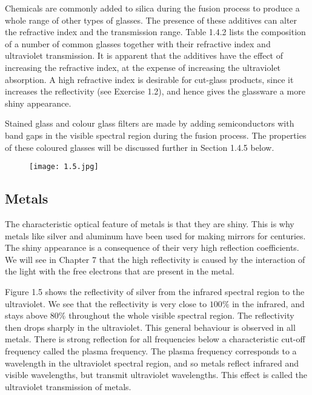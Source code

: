 \documentclass[12pt]{book}
\begin{document}
Chemicals are commonly added to silica during the fusion process to produce a whole range of other types of glasses. The presence of these additives can alter the refractive index and the transmission range. Table 1.4.2 lists the composition of a number of common glasses together with their refractive index and ultraviolet transmission. It is apparent that the additives have the effect of increasing the refractive index, at the expense of increasing the ultraviolet absorption. A high refractive index is desirable for cut-glass products, since it increases the reflectivity (see Exercise 1.2), and hence gives the glassware a more shiny appearance.

Stained glass and colour glass filters are made by adding semiconductors with band gaps in the visible spectral region during the fusion process. The properties of these coloured glasses will be discussed further in Section 1.4.5 below.

\begin{figure}
  \centering
  \texttt{[image: 1.5.jpg]}\label{fig:1.5}\\
\end{figure}

\subsection{Metals}

The characteristic optical feature of metals is that they are shiny. This is why metals like silver and aluminum have been used for making mirrors for centuries. The shiny appearance is a consequence of their very high reflection coefficients. We will see in Chapter 7 that the high reflectivity is caused by the interaction of the light with the free electrons that are present in the metal.

Figure 1.5 shows the reflectivity of silver from the infrared spectral region to the ultraviolet. We see that the reflectivity is very close to $100 \%$ in the infrared, and stays above $80 \%$ throughout the whole visible spectral region. The reflectivity then drops sharply in the ultraviolet. This general behaviour is observed in all metals. There is strong reflection for all frequencies below a characteristic cut-off frequency called the plasma frequency. The plasma frequency corresponds to a wavelength in the ultraviolet spectral region, and so metals reflect infrared and visible wavelengths, but transmit ultraviolet wavelengths. This effect is called the ultraviolet transmission of metals.
\end{document}
